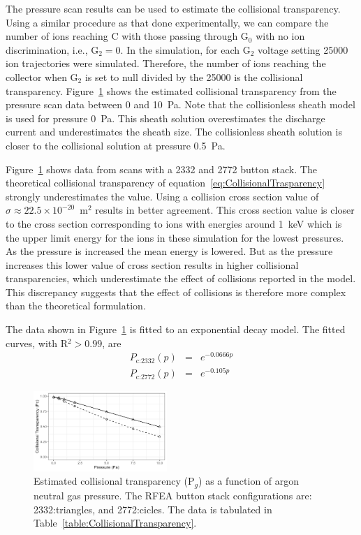 The pressure scan results can be used to estimate the collisional transparency. Using a similar procedure as that done experimentally, we can compare the number of ions reaching C with those passing through G$_0$ with no ion discrimination, i.e., G$_2 =0$. In the simulation, for each G$_2$ voltage setting 25000 ion trajectories were simulated. Therefore, the number of ions reaching the collector when G$_2$ is set to null divided by the 25000 is the collisional transparency. Figure~\ref{fig:CollisionalTransparency} shows the estimated collisional transparency from the pressure scan data between 0 and 10~Pa. Note that the collisionless sheath model is used for pressure 0~Pa. This sheath solution overestimates the discharge current and underestimates the sheath size. The collisionless sheath solution is closer to the collisional solution at pressure 0.5~Pa. 

Figure~\ref{fig:CollisionalTransparency} shows data from scans with a 2332 and 2772 button stack. The theoretical collisional transparency of equation~\ref{eq:CollisionalTrasparency} strongly underestimates the value. Using a collision cross section value of $\sigma \approx 22.5 \times 10^{-20}$~m$^2$ results in better agreement. This cross section value is closer to the cross section corresponding to ions with energies around 1~keV which is the upper limit energy for the ions in these simulation for the lowest pressures. As the pressure is increased the mean energy is lowered. But as the pressure increases this lower value of cross section results in higher collisional transparencies, which underestimate the effect of collisions reported in the model. This discrepancy suggests that the effect of collisions is therefore more complex than the theoretical formulation.  

The data shown in Figure~\ref{fig:CollisionalTransparency} is fitted to an exponential decay model. The fitted curves, with R$^2 > 0.99$, are
\begin{eqnarray}
P_\text{c:2332} (p) &=& e^{-0.0666 p} \\
P_\text{c:2772} (p) &=& e^{-0.105 p} 
\end{eqnarray}    

\begin{figure}[htbp]
\centering
\includegraphics[width=0.45\textwidth]{Figures/CollisionalTransparency.jpeg}
\caption{Estimated collisional transparency (P$_g$) as a function of argon neutral gas pressure. The RFEA button stack configurations are: 2332:triangles, and 2772:cicles. The data is tabulated in Table~\ref{table:CollisionalTransparency}.}
\label{fig:CollisionalTransparency}
\end{figure}



